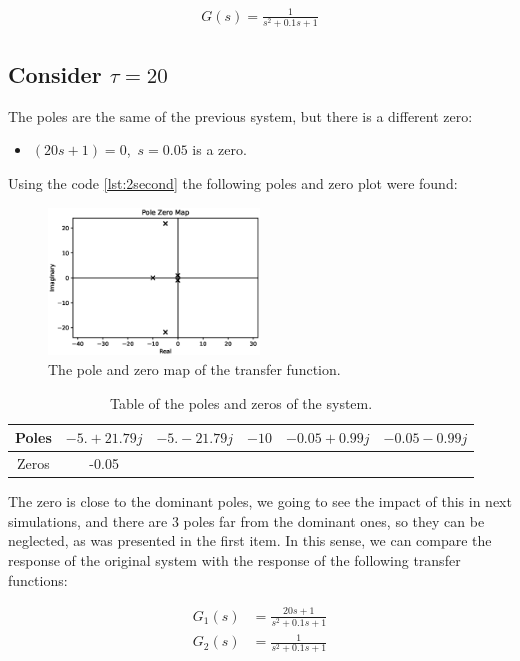\documentclass[a4paper]{article}
\begin{document}
\begin{align*}
    G(s)=\frac{1}{s^2 + 0.1 s + 1}
\end{align*}
\subsection*{Consider $\tau = 20$}
The poles are the same of the previous system, but there is a different zero:
\begin{itemize}
    \item $(20s+1)=0$,\ $s=0.05$ is a zero.
\end{itemize}

Using the code \ref{lst:2second} the following poles and zero plot were found:

\begin{figure}[H]
    \centering
    \includegraphics[width=0.5\textwidth]{Figures/Question2/EXE_2_POLE_ZERO_MAP_2.eps}
    \caption{The pole and zero map of the transfer function.}
    \label{fig:EXE_2_POLE_ZERO_MAP_2}
\end{figure}

\begin{table}[H]
\centering
\begin{tabular}{|c|c|c|c|c|c|}
\hline
Poles & $-5. +21.79j$&$-5. -21.79j$& $-10$&$-0.05 +0.99j$& $-0.05 -0.99j$\\
\hline
Zeros & -0.05 & & & &\\
\hline
\end{tabular}
\caption{Table of the poles and zeros of the system.}
\end{table}

The zero is close to the dominant poles, we going to see the impact of this in next simulations, and there are 3 poles far from the dominant ones, so they can be neglected, as was presented in the first item. In this sense, we can compare the response of the original system with the response of the following transfer functions:

\begin{align*}
G_1(s) &=  \frac{20 s + 1}{s^2 + 0.1 s + 1}\\
G_2(s) &=  \frac{1}{s^2 + 0.1 s + 1}
\end{align*}
\end{document}
